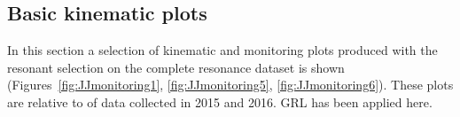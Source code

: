 

\subsection{Basic kinematic plots}
\label{sec:kinematic_distributions}

%
%
%

In this section a selection of kinematic and monitoring plots produced with the resonant selection on the complete resonance dataset is shown 
(Figures~\ref{fig:JJmonitoring1},  
\ref{fig:JJmonitoring5}, \ref{fig:JJmonitoring6}). These plots are relative to \integLumi of data collected in 2015 and 2016.
 GRL has been applied here.


